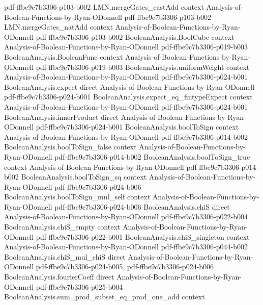 \begin{lemma}
  {pdf-ffbe9c7b3306-p103-b002}
\proofstep
  {LMN.mergeGates_castAdd}
  {context}
  {Analysis-of-Boolean-Functions-by-Ryan-ODonnell}
  {pdf-ffbe9c7b3306-p103-b002}
\proofstep
  {LMN.mergeGates_natAdd}
  {context}
  {Analysis-of-Boolean-Functions-by-Ryan-ODonnell}
  {pdf-ffbe9c7b3306-p103-b002}
\proofstep
  {BooleanAnalysis.BoolCube}
  {context}
  {Analysis-of-Boolean-Functions-by-Ryan-ODonnell}
  {pdf-ffbe9c7b3306-p019-b003}
\proofstep
  {BooleanAnalysis.BooleanFunc}
  {context}
  {Analysis-of-Boolean-Functions-by-Ryan-ODonnell}
  {pdf-ffbe9c7b3306-p019-b003}
\proofstep
  {BooleanAnalysis.uniformWeight}
  {context}
  {Analysis-of-Boolean-Functions-by-Ryan-ODonnell}
  {pdf-ffbe9c7b3306-p024-b001}
\proofstep
  {BooleanAnalysis.expect}
  {direct}
  {Analysis-of-Boolean-Functions-by-Ryan-ODonnell}
  {pdf-ffbe9c7b3306-p024-b001}
\proofstep
  {BooleanAnalysis.expect_eq_fintypeExpect}
  {context}
  {Analysis-of-Boolean-Functions-by-Ryan-ODonnell}
  {pdf-ffbe9c7b3306-p024-b001}
\proofstep
  {BooleanAnalysis.innerProduct}
  {direct}
  {Analysis-of-Boolean-Functions-by-Ryan-ODonnell}
  {pdf-ffbe9c7b3306-p024-b001}
\proofstep
  {BooleanAnalysis.boolToSign}
  {context}
  {Analysis-of-Boolean-Functions-by-Ryan-ODonnell}
  {pdf-ffbe9c7b3306-p014-b002}
\proofstep
  {BooleanAnalysis.boolToSign_false}
  {context}
  {Analysis-of-Boolean-Functions-by-Ryan-ODonnell}
  {pdf-ffbe9c7b3306-p014-b002}
\proofstep
  {BooleanAnalysis.boolToSign_true}
  {context}
  {Analysis-of-Boolean-Functions-by-Ryan-ODonnell}
  {pdf-ffbe9c7b3306-p014-b002}
\proofstep
  {BooleanAnalysis.boolToSign_sq}
  {context}
  {Analysis-of-Boolean-Functions-by-Ryan-ODonnell}
  {pdf-ffbe9c7b3306-p024-b006}
\proofstep
  {BooleanAnalysis.boolToSign_mul_self}
  {context}
  {Analysis-of-Boolean-Functions-by-Ryan-ODonnell}
  {pdf-ffbe9c7b3306-p024-b006}
\proofstep
  {BooleanAnalysis.chiS}
  {direct}
  {Analysis-of-Boolean-Functions-by-Ryan-ODonnell}
  {pdf-ffbe9c7b3306-p022-b004}
\proofstep
  {BooleanAnalysis.chiS_empty}
  {context}
  {Analysis-of-Boolean-Functions-by-Ryan-ODonnell}
  {pdf-ffbe9c7b3306-p022-b001}
\proofstep
  {BooleanAnalysis.chiS_singleton}
  {context}
  {Analysis-of-Boolean-Functions-by-Ryan-ODonnell}
  {pdf-ffbe9c7b3306-p044-b002}
\proofstep
  {BooleanAnalysis.chiS_mul_chiS}
  {direct}
  {Analysis-of-Boolean-Functions-by-Ryan-ODonnell}
  {pdf-ffbe9c7b3306-p024-b005,
    pdf-ffbe9c7b3306-p024-b006}
\proofstep
  {BooleanAnalysis.fourierCoeff}
  {direct}
  {Analysis-of-Boolean-Functions-by-Ryan-ODonnell}
  {pdf-ffbe9c7b3306-p025-b004}
\proofstep
  {BooleanAnalysis.sum_prod_subset_eq_prod_one_add}
  {context}

\end{lemma}
